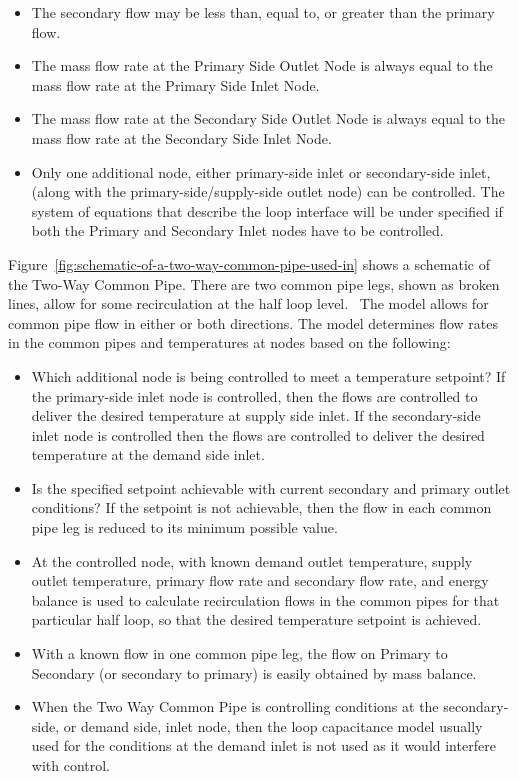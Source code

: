 \begin{itemize}
\item
  The secondary flow may be less than, equal to, or greater than the primary flow.
\item
  The mass flow rate at the Primary Side Outlet Node is always equal to the mass flow rate at the Primary Side Inlet Node.
\item
  The mass flow rate at the Secondary Side Outlet Node is always equal to the mass flow rate at the Secondary Side Inlet Node.
\item
  Only one additional node, either primary-side inlet or secondary-side inlet, (along with the primary-side/supply-side outlet node) can be controlled. The system of equations that describe the loop interface will be under specified if both the Primary and Secondary Inlet nodes have to be controlled.
\end{itemize}

Figure~\ref{fig:schematic-of-a-two-way-common-pipe-used-in} shows a schematic of the Two-Way Common Pipe. There are two common pipe legs, shown as broken lines, allow for some recirculation at the half loop level.~ The model allows for common pipe flow in either or both directions. The model determines flow rates in the common pipes and temperatures at nodes based on the following:

\begin{itemize}
\item
  Which additional node is being controlled to meet a temperature setpoint? If the primary-side inlet node is controlled, then the flows are controlled to deliver the desired temperature at supply side inlet. If the secondary-side inlet node is controlled then the flows are controlled to deliver the desired temperature at the demand side inlet.
\item
  Is the specified setpoint achievable with current secondary and primary outlet conditions? If the setpoint is not achievable, then the flow in each common pipe leg is reduced to its minimum possible value.
\item
  At the controlled node, with known demand outlet temperature, supply outlet temperature, primary flow rate and secondary flow rate, and energy balance is used to calculate recirculation flows in the common pipes for that particular half loop, so that the desired temperature setpoint is achieved.
\item
  With a known flow in one common pipe leg, the flow on Primary to Secondary (or secondary to primary) is easily obtained by mass balance.
\item
  When the Two Way Common Pipe is controlling conditions at the secondary-side, or demand side, inlet node, then the loop capacitance model usually used for the conditions at the demand inlet is not used as it would interfere with control.
\end{itemize}

